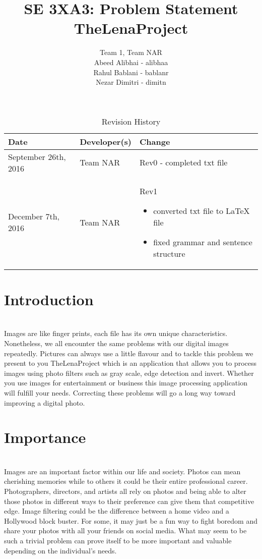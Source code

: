 \documentclass{article}
\title{SE 3XA3: Problem Statement\\TheLenaProject}
\author{Team 1, Team NAR
		\\Abeed Alibhai - alibhaa
		\\Rahul Bablani - bablanr
		\\Nezar Dimitri - dimitn
}
\date{}
\begin{document}
\begin{table}[hp]
\caption{Revision History} \label{TblRevisionHistory}
\begin{tabularx}{\textwidth}{llX}
\toprule
\textbf{Date} & \textbf{Developer(s)} & \textbf{Change}\\
\midrule
September 26th, 2016 & Team NAR & Rev0 - completed txt file\\ 
December 7th, 2016 & Team NAR & Rev1
\begin{itemize}
	\item converted txt file to LaTeX file
	\item fixed grammar and sentence structure
\end{itemize}
\\
\bottomrule
\end{tabularx}
\end{table}

\newpage

\maketitle

\section{Introduction}
\\
Images are like finger prints, each file has its own unique characteristics. Nonetheless, we all encounter the same problems with our digital images repeatedly. Pictures can always use a little flavour and to tackle this problem we present to you TheLenaProject which is an application that allows you to process images using photo filters such as gray scale, edge detection and invert. Whether you use images for entertainment or business this image processing application will fulfill your needs. Correcting these problems will go a long way toward improving a digital photo.

\section{Importance}
\\
Images are an important factor within our life and society. Photos can mean cherishing memories while to others it could be their entire professional career. Photographers, directors, and artists all rely on photos and being able to alter those photos in different ways to their preference can give them that competitive edge. Image filtering could be the difference between a home video and a Hollywood block buster. For some, it may just be a fun way to fight boredom and share your photos with all your friends on social media. What may seem to be such a trivial problem can prove itself to be more important and valuable depending on the individual's needs. 
\end{document}
